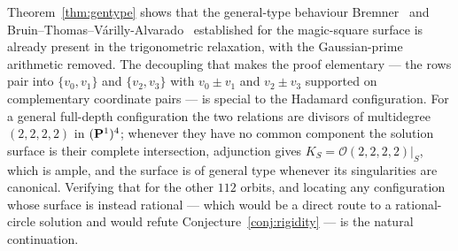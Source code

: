 Theorem~\ref{thm:gentype} shows that the general-type behaviour Bremner~\cite{Bremner2001} and
Bruin--Thomas--V\'arilly-Alvarado~\cite{BTV} established for the magic-square surface is already present in the trigonometric
relaxation, with the Gaussian-prime arithmetic removed. The decoupling that makes the proof elementary — the rows pair into
$\{v_0,v_1\}$ and $\{v_2,v_3\}$ with $v_0\pm v_1$ and $v_2\pm v_3$ supported on complementary coordinate pairs — is special
to the Hadamard configuration. For a general full-depth configuration the two relations are divisors of multidegree $(2,2,2,2)$ in $(\mathbf P^1)^4$; whenever
they have no common component the solution surface is their complete intersection, adjunction gives
$K_S=\mathcal O(2,2,2,2)|_S$, which is ample, and the surface is of general type whenever its singularities are canonical. Verifying that for the other $112$ orbits, and
locating any configuration whose surface is instead rational — which would be a direct route to a rational-circle solution
and would refute Conjecture~\ref{conj:rigidity} — is the natural continuation.
